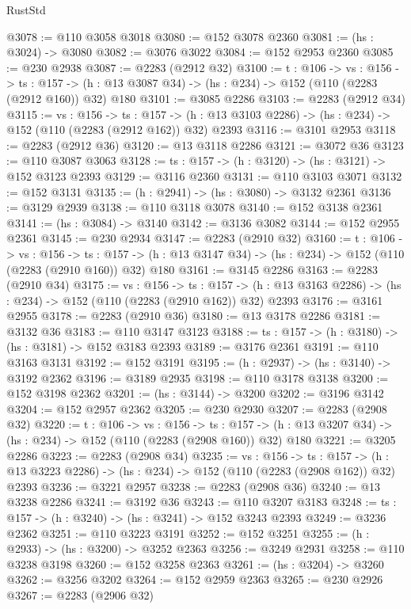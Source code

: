\begin{lexlean}{RustStd}
\begin{coremodule}
@3078 := @110 @3058 @3018
@3080 := @152 @3078 @2360
@3081 := (hs : @3024) -> @3080
@3082 := @3076 @3022
@3084 := @152 @2953 @2360
@3085 := @230 @2938
@3087 := @2283 (@2912 @32)
@3100 := {t : @106} ->
  {vs : @156} ->
  {ts : @157} -> (h : @13 @3087 @34) -> (hs : @234) -> @152 (@110 (@2283 (@2912 @160)) @32) @180
@3101 := @3085 @2286
@3103 := @2283 (@2912 @34)
@3115 := {vs : @156} ->
  {ts : @157} -> (h : @13 @3103 @2286) -> (hs : @234) -> @152 (@110 (@2283 (@2912 @162)) @32) @2393
@3116 := @3101 @2953
@3118 := @2283 (@2912 @36)
@3120 := @13 @3118 @2286
@3121 := @3072 @36
@3123 := @110 @3087 @3063
@3128 := {ts : @157} -> (h : @3120) -> (hs : @3121) -> @152 @3123 @2393
@3129 := @3116 @2360
@3131 := @110 @3103 @3071
@3132 := @152 @3131
@3135 := (h : @2941) -> (hs : @3080) -> @3132 @2361
@3136 := @3129 @2939
@3138 := @110 @3118 @3078
@3140 := @152 @3138 @2361
@3141 := (hs : @3084) -> @3140
@3142 := @3136 @3082
@3144 := @152 @2955 @2361
@3145 := @230 @2934
@3147 := @2283 (@2910 @32)
@3160 := {t : @106} ->
  {vs : @156} ->
  {ts : @157} -> (h : @13 @3147 @34) -> (hs : @234) -> @152 (@110 (@2283 (@2910 @160)) @32) @180
@3161 := @3145 @2286
@3163 := @2283 (@2910 @34)
@3175 := {vs : @156} ->
  {ts : @157} -> (h : @13 @3163 @2286) -> (hs : @234) -> @152 (@110 (@2283 (@2910 @162)) @32) @2393
@3176 := @3161 @2955
@3178 := @2283 (@2910 @36)
@3180 := @13 @3178 @2286
@3181 := @3132 @36
@3183 := @110 @3147 @3123
@3188 := {ts : @157} -> (h : @3180) -> (hs : @3181) -> @152 @3183 @2393
@3189 := @3176 @2361
@3191 := @110 @3163 @3131
@3192 := @152 @3191
@3195 := (h : @2937) -> (hs : @3140) -> @3192 @2362
@3196 := @3189 @2935
@3198 := @110 @3178 @3138
@3200 := @152 @3198 @2362
@3201 := (hs : @3144) -> @3200
@3202 := @3196 @3142
@3204 := @152 @2957 @2362
@3205 := @230 @2930
@3207 := @2283 (@2908 @32)
@3220 := {t : @106} ->
  {vs : @156} ->
  {ts : @157} -> (h : @13 @3207 @34) -> (hs : @234) -> @152 (@110 (@2283 (@2908 @160)) @32) @180
@3221 := @3205 @2286
@3223 := @2283 (@2908 @34)
@3235 := {vs : @156} ->
  {ts : @157} -> (h : @13 @3223 @2286) -> (hs : @234) -> @152 (@110 (@2283 (@2908 @162)) @32) @2393
@3236 := @3221 @2957
@3238 := @2283 (@2908 @36)
@3240 := @13 @3238 @2286
@3241 := @3192 @36
@3243 := @110 @3207 @3183
@3248 := {ts : @157} -> (h : @3240) -> (hs : @3241) -> @152 @3243 @2393
@3249 := @3236 @2362
@3251 := @110 @3223 @3191
@3252 := @152 @3251
@3255 := (h : @2933) -> (hs : @3200) -> @3252 @2363
@3256 := @3249 @2931
@3258 := @110 @3238 @3198
@3260 := @152 @3258 @2363
@3261 := (hs : @3204) -> @3260
@3262 := @3256 @3202
@3264 := @152 @2959 @2363
@3265 := @230 @2926
@3267 := @2283 (@2906 @32)

\end{coremodule}
\end{lexlean}
